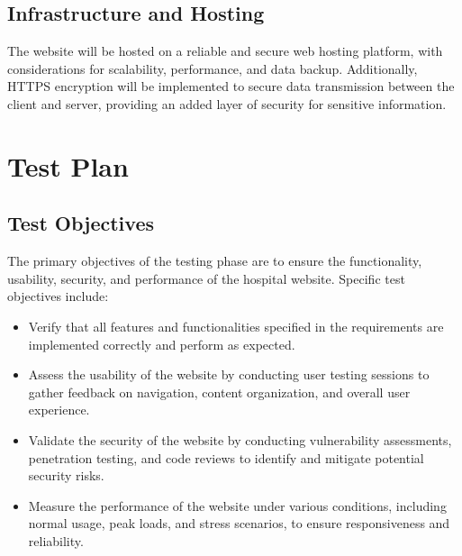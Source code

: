 \documentclass{article}
\begin{document}
\subsection{Infrastructure and Hosting}
The website will be hosted on a reliable and secure web hosting platform, with considerations for scalability, performance, and data backup. Additionally, HTTPS encryption will be implemented to secure data transmission between the client and server, providing an added layer of security for sensitive information.


\clearpage

\section{Test Plan} \label{sec:test_plan}

\subsection{Test Objectives}
The primary objectives of the testing phase are to ensure the functionality, usability, security, and performance of the hospital website. Specific test objectives include:
\begin{itemize}
    \item Verify that all features and functionalities specified in the requirements are implemented correctly and perform as expected.
    \item Assess the usability of the website by conducting user testing sessions to gather feedback on navigation, content organization, and overall user experience.
    \item Validate the security of the website by conducting vulnerability assessments, penetration testing, and code reviews to identify and mitigate potential security risks.
    \item Measure the performance of the website under various conditions, including normal usage, peak loads, and stress scenarios, to ensure responsiveness and reliability.
\end{itemize}
\end{document}
